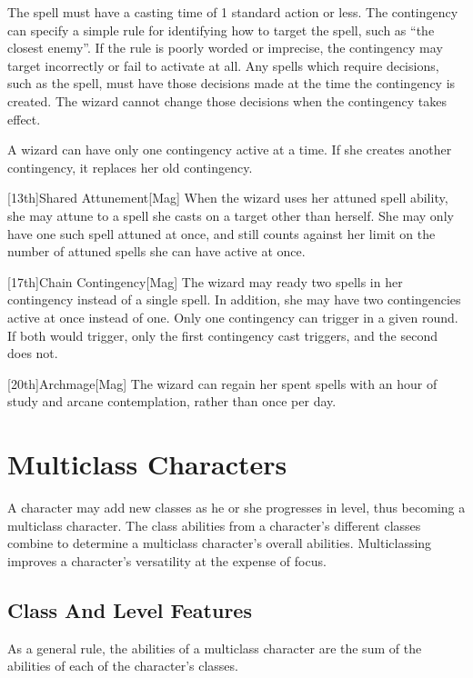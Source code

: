         The spell must have a casting time of 1 standard action or less.
        The contingency can specify a simple rule for identifying how to target the spell, such as ``the closest enemy''.
        If the rule is poorly worded or imprecise, the contingency may target incorrectly or fail to activate at all.
        Any spells which require decisions, such as the  spell, must have those decisions made at the time the contingency is created.
        The wizard cannot change those decisions when the contingency takes effect.

        A wizard can have only one contingency active at a time.
        If she creates another contingency, it replaces her old contingency.

        [13th]{Shared Attunement}[Mag]
        When the wizard uses her attuned spell ability, she may attune to a spell she casts on a target other than herself.
        She may only have one such spell attuned at once, and still counts against her limit on the number of attuned spells she can have active at once.

        [17th]{Chain Contingency}[Mag]
        The wizard may ready two spells in her contingency instead of a single spell.
        In addition, she may have two contingencies active at once instead of one.
        Only one contingency can trigger in a given round.
        If both would trigger, only the first contingency cast triggers, and the second does not.

        [20th]{Archmage}[Mag]
        The wizard can regain her spent spells with an hour of study and arcane contemplation, rather than once per day.

\section{Multiclass Characters}\label{Multiclass Characters}
    A character may add new classes as he or she progresses in level, thus becoming a multiclass character.
    The class abilities from a character's different classes combine to determine a multiclass character's overall abilities.
    Multiclassing improves a character's versatility at the expense of focus.

    \subsection{Class And Level Features}
        As a general rule, the abilities of a multiclass character are the sum
        of the abilities of each of the character's classes.

